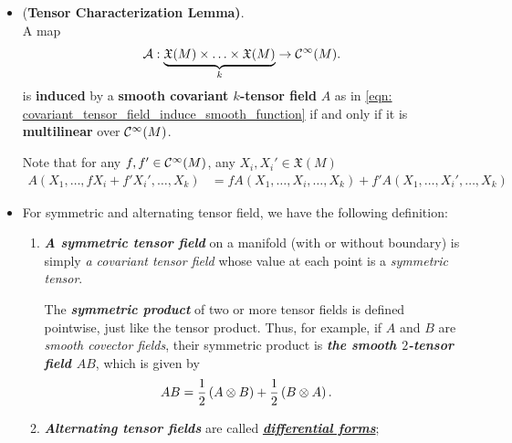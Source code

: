 \documentclass[11pt]{article}
\begin{document}
\begin{itemize}
\item \begin{lemma} (\textbf{Tensor Characterization Lemma)}.\citep{lee2003introduction}\\
A map 
\begin{align}
\mathcal{A}: \underbrace{\mathfrak{X}(M)\times \ldots \times \mathfrak{X}(M)}_{k} \rightarrow  {\mathcal C}^{\infty}(M).  \label{eqn: tensor_characterization}
\end{align} is \textbf{induced} by a \textbf{smooth covariant $k$-tensor field} $A$ as in \eqref{eqn: covariant_tensor_field_induce_smooth_function} if and only if it is \textbf{multilinear} over ${\mathcal C}^{\infty}(M)$.
\end{lemma}
\begin{remark}
Note that for any $f, f' \in {\mathcal C}^{\infty}(M)$, any $X_i, X_i' \in \mathfrak{X}(M)$
\begin{align*}
A(X_1,\ldots, fX_i + f'X_i', \ldots, X_k) &= fA(X_1,\ldots, X_i , \ldots, X_k) + f'A(X_1,\ldots, X_i', \ldots, X_k) 
\end{align*}
\end{remark}

\item \begin{definition} For symmetric and alternating tensor field, we have the following definition:
\begin{enumerate}
\item \emph{\textbf{A symmetric tensor field}} on a manifold (with or without boundary) is simply \emph{a covariant tensor field} whose value at each point is a \emph{symmetric tensor}. 

The \emph{\textbf{symmetric product}} of two or more tensor fields is defined pointwise, just like the tensor product. Thus, for example, if $A$ and $B$ are \emph{smooth covector fields}, their symmetric product is \emph{\textbf{the smooth $2$-tensor field $AB$}}, which is given by
\begin{align*}
AB &= \frac{1}{2}\left(A \otimes B\right) + \frac{1}{2}\left(B \otimes A\right).
\end{align*}


\item \emph{\textbf{Alternating tensor fields}} are called \underline{\emph{\textbf{differential forms}}};
\end{enumerate}
\end{definition}
\end{itemize}
\end{document}
